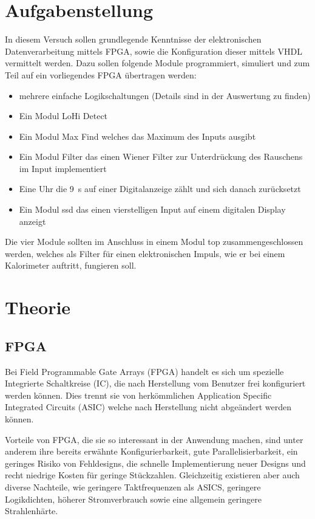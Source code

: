 \section{Aufgabenstellung}
In diesem Versuch sollen grundlegende Kenntnisse der elektronischen Datenverarbeitung mittels FPGA, sowie die Konfiguration dieser mittels VHDL vermittelt werden.
Dazu sollen folgende Module programmiert, simuliert und zum Teil auf ein vorliegendes FPGA übertragen werden:
\begin{itemize}
\item mehrere einfache Logikschaltungen (Details sind in der Auswertung zu finden)
\item Ein Modul \glqq LoHi Detect\grqq{}
\item Ein Modul \glqq Max Find\grqq{} welches das Maximum des Inputs ausgibt
\item Ein Modul \glqq Filter\grqq{} das einen Wiener Filter zur Unterdrückung des Rauschens im Input implementiert
\item Eine Uhr die \SI{9}{\s} auf einer Digitalanzeige zählt und sich danach zurücksetzt
\item Ein Modul \glqq ssd\grqq{} das einen vierstelligen Input auf einem digitalen Display anzeigt
\end{itemize}
Die vier Module sollten im Anschluss in einem Modul \glqq top\grqq{} zusammengeschlossen werden, welches als Filter für einen elektronischen Impuls, wie er bei einem Kalorimeter auftritt, fungieren soll.

\section{Theorie}

\subsection{FPGA}
Bei Field Programmable Gate Arrays (FPGA) handelt es sich um spezielle Integrierte Schaltkreise (IC), die nach Herstellung vom Benutzer frei konfiguriert werden können.
Dies trennt sie von herkömmlichen Application Specific Integrated Circuits (ASIC) welche nach Herstellung nicht abgeändert werden können.

Vorteile von FPGA, die sie so interessant in der Anwendung machen, sind unter anderem ihre bereits erwähnte Konfigurierbarkeit, gute Parallelisierbarkeit, ein geringes Risiko von Fehldesigns, die schnelle Implementierung neuer Designs und recht niedrige Kosten für geringe Stückzahlen.
Gleichzeitig existieren aber auch diverse Nachteile, wie geringere Taktfrequenzen als ASICS, geringere Logikdichten, höherer Stromverbrauch sowie eine allgemein geringere Strahlenhärte.

